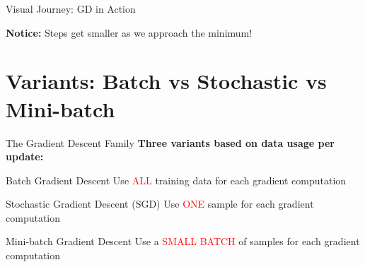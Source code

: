 \documentclass[usenames,dvipsnames]{beamer}
\begin{document}
\begin{frame}{Visual Journey: GD in Action}
\begin{center}
    \end{center}
    
    \textbf{Notice:} Steps get smaller as we approach the minimum!
  \end{frame}

  \section{Variants: Batch vs Stochastic vs Mini-batch}

  \begin{frame}{The Gradient Descent Family}
    \textbf{Three variants based on data usage per update:}
    
    \begin{definitionbox}{Batch Gradient Descent}
    Use \textcolor{red}{ALL} training data for each gradient computation
    \end{definitionbox}
    
    \begin{definitionbox}{Stochastic Gradient Descent (SGD)}  
    Use \textcolor{red}{ONE} sample for each gradient computation
    \end{definitionbox}
    
    \begin{definitionbox}{Mini-batch Gradient Descent}
    Use a \textcolor{red}{SMALL BATCH} of samples for each gradient computation
    \end{definitionbox}
  \end{frame}
\end{document}
